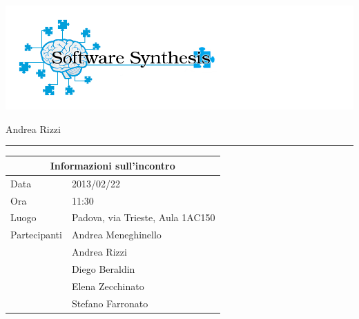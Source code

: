 \documentclass[a4paper,10pt,openright]{article}
\begin{document}
\includegraphics[width=1.5\textwidth]{logo}

\begin{center}

\begin{Large}
\hspace{1.2cm}{Verbale d'incontro esterno con il Docente in data 2013/02/22}
\newline
\end{Large}

\begin{small}
	Andrea Rizzi
\end{small}

\noindent\rule{\textwidth}{0.4pt}
\newline

\begin{tabular}{ll}
\toprule
\multicolumn{2}{c}{\sffamily Informazioni sull'incontro}\\
\midrule
Data & 2013/02/22 \\
Ora & 11:30 \\
Luogo & Padova, via Trieste, Aula 1AC150 \\
Partecipanti & Andrea Meneghinello \\ & Andrea Rizzi \\& Diego Beraldin \\& Elena Zecchinato \\ & Stefano Farronato \\
\bottomrule
\end{tabular}

\end{center}
\end{document}
